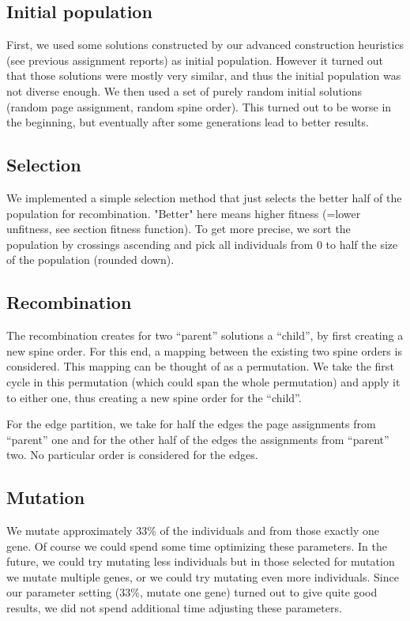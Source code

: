 \documentclass [11pt]{article}
\begin{document}
\subsection{Initial population}

First, we used some solutions constructed by our advanced construction heuristics (see previous assignment reports) as initial population. However it turned out that those solutions were mostly very similar, and thus the initial population was not diverse enough. We then used a set of purely random initial solutions (random page assignment, random spine order). This turned out to be worse in the beginning, but eventually after some generations lead to better results.


\subsection{Selection}

We implemented a simple selection method that just selects the better half of the population for recombination. "Better" here means higher fitness (=lower unfitness, see section fitness function). To get more precise, we sort the population by crossings ascending and pick all individuals from 0 to half the size of the population (rounded down).

\subsection{Recombination}
The recombination creates for two ``parent'' solutions a ``child'', by first creating a new spine order. For this end, a mapping between the existing two spine orders is considered. This mapping can be thought of as a permutation. We take the first cycle in this permutation (which could span the whole permutation) and apply it to either one, thus creating a new spine order for the ``child''. 

For the edge partition, we take for half the edges the page assignments from ``parent'' one and for the other half of the edges the assignments from ``parent'' two. No particular order is considered for the edges.

\subsection{Mutation}

We mutate approximately 33\% of the individuals and from those exactly one gene. Of course we could spend some time optimizing these parameters. In the future, we could try mutating less individuals but in those selected for mutation we mutate multiple genes, or we could try mutating even more individuals. Since our parameter setting (33\%, mutate one gene) turned out to give quite good results, we did not spend additional time adjusting these parameters.
\end{document}
